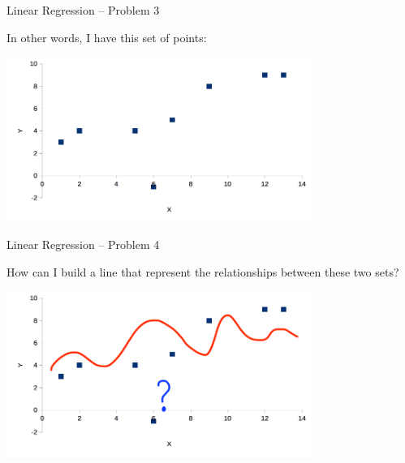 \documentclass{beamer}
\begin{document}
\begin{frame}
{\centerline{Linear Regression -- Problem 3}}

In other words, I have this set of points:

\begin{center}
\includegraphics[width=10cm]{P2023.AIBCCSS.FoundationsDataScience/LinearRegression_Points.png}
\end{center}

\end{frame}

\begin{frame}
{\centerline{Linear Regression -- Problem 4}}

How can I build a line that represent the relationships between these two sets?

\begin{center}
\includegraphics[width=10cm]{P2023.AIBCCSS.FoundationsDataScience/LinearRegression_Lines.png}
\end{center}



\end{frame}
\end{document}
